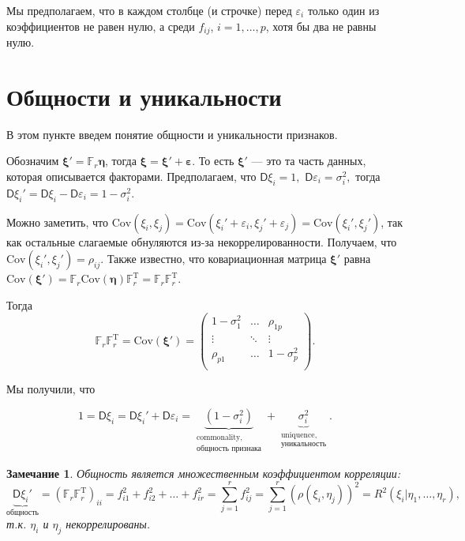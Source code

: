 \documentclass[specialist, 12pt,
subf, %
href, colorlinks=true,
substylefile = spbu.rtx,
]{disser}
\newtheorem{remark}{Замечание}
\begin{document}
Мы предполагаем, что в каждом столбце (и строчке) перед $\varepsilon_i$ только один из коэффициентов не равен нулю, а среди $f_{ij}$, $i=1,\ldots,p$, хотя бы два не равны нулю.

\section{Общности и уникальности}

В этом пункте введем понятие общности и уникальности признаков.

Обозначим $\bm\xi'= \mathbb{F}_r \bm\eta$, тогда $\bm\xi = \bm\xi'+\bm\varepsilon$. То есть $\bm\xi'$ --- это та часть данных, которая описывается факторами. Предполагаем, что $\textsf{D}\xi_i=1,$ $\textsf{D}\varepsilon_i=\sigma_i^2,$ тогда $\textsf{D}\xi_i'=\textsf{D}\xi_i-\textsf{D}\varepsilon_i= 1-\sigma_i^2.$

Можно заметить, что $\text{Cov}(\xi_i, \xi_j)=\text{Cov}(\xi_i'+\varepsilon_i, \xi_j'+\varepsilon_j) = \text{Cov}(\xi_i', \xi_j')$, так как остальные слагаемые обнуляются из-за некоррелированности. Получаем, что $\text{Cov}(\xi_i', \xi_j')=\rho_{ij}$. Также известно, что ковариационная матрица $\bm\xi'$ равна $\text{Cov} (\bm\xi') = \mathbb{F}_r \text{Cov}(\bm\eta) \mathbb{F}_r^\mathrm{T} = \mathbb{F}_r\mathbb{F}_r^\mathrm{T}.$

Тогда
\begin{equation*}
\mathbb{F}_r\mathbb{F}_r^\mathrm{T} = \text{Cov} (\bm\xi') =
\left(\begin{matrix}
1-\sigma_1^2 & \ldots & \rho_{1p} \\
\vdots & \ddots & \vdots \\
\rho_{p1} & \ldots & 1-\sigma_p^2 \\
\end{matrix}  \right).
\end{equation*}

Мы получили, что

\begin{equation*}
1 = \textsf{D}\xi_i = \textsf{D}\xi_i'+\textsf{D}\varepsilon_i = \underbrace{(1-\sigma_i^2)}_{\substack{\text{commonality}, \\  \text{общность признака}}} + \underbrace{\sigma_i^2}_{\substack{\text{uniquence}, \\  \text{уникальность}}}.
\end{equation*}


\begin{remark}
 Общность является множественным коэффициентом корреляции:
 \begin{equation*}
\underbrace{\textsf{D}\xi_i'}_{\text{общность}} = (\mathbb{F}_r\mathbb{F}_r^\mathrm{T})_{ii} = f_{i1}^2+f_{i2}^2+\ldots+f_{ir}^2 = \sum\limits_{j=1}^r f_{ij}^2 = \sum \limits_{j=1}^r (\rho(\xi_i,\eta_j))^2 = R^2(\xi_i | \eta_1,\ldots, \eta_r),
 \end{equation*}
 т.к. $\eta_i$ и $\eta_j$ некоррелированы.
\end{remark}
\end{document}
